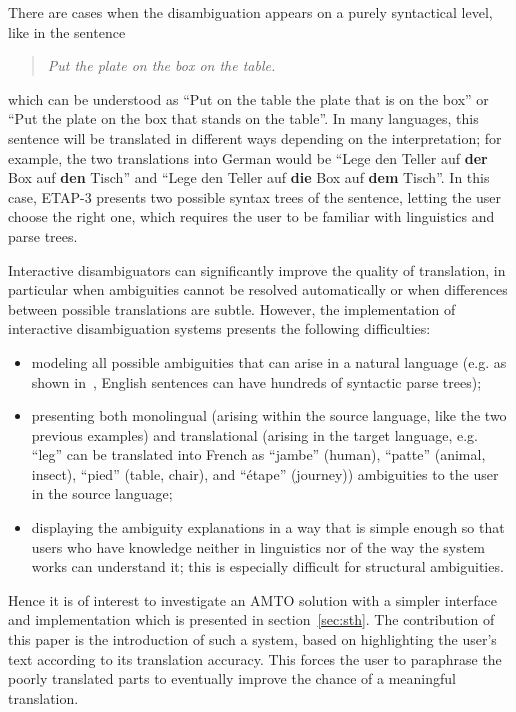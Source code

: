 \documentclass[hidelinks,10pt,letter]{article} %
\begin{document}
      There are cases when the disambiguation appears on a purely syntactical level, like in the sentence
      \begin{quote}\textit{Put the plate on the box on the table.}\end{quote}
      which can be understood as ``Put on the table the plate that is on the box'' or ``Put the plate on the box that stands on the table''.
      In many languages, this sentence will be translated in different ways depending on the interpretation; for example,
      the two translations into German would be ``Lege den Teller auf \textbf{der} Box auf \textbf{den} Tisch'' and 
      ``Lege den Teller auf \textbf{die} Box auf \textbf{dem} Tisch''.
      In this case, ETAP-3 presents two possible syntax trees of the sentence, letting the user choose the right one, which
      requires the user to be familiar with linguistics and parse trees. 
      
      Interactive disambiguators can significantly improve
      the quality of translation, in particular when ambiguities cannot be
      resolved automatically or when differences between possible translations are
      subtle. However, the implementation of interactive disambiguation systems presents the following difficulties:
      \begin{itemize}
        \item modeling all possible ambiguities
         that can arise
          in a natural language (e.g. as shown in~\cite{church1982coping}, English sentences
          can have hundreds of syntactic parse trees);
        \item presenting both monolingual (arising within the source language, like the two previous examples) 
            and translational (arising in the target language, e.g. ``leg'' can be translated into French as
            ``jambe'' (human), ``patte'' (animal, insect), ``pied'' (table, chair), and ``\'etape'' (journey)) 
            ambiguities to the user in the source language;
        \item displaying the ambiguity explanations in a  way that is simple enough so that
        users who have  knowledge neither in linguistics nor of the way the system works
        can understand it; this is especially difficult for structural ambiguities.
      \end{itemize}
      
      Hence it is of interest to investigate an AMTO solution with a simpler interface and implementation
      which is presented in section~\ref{sec:sth}. The contribution of this paper is the introduction of such a system,
      based on highlighting the user's text according to its translation accuracy. This forces the
      user to paraphrase the poorly translated parts to eventually improve the chance of a meaningful translation.
    
\end{document}
